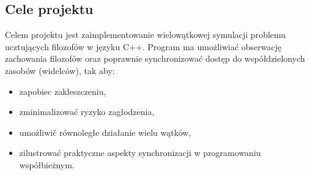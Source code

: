 \documentclass[a4paper,12pt]{article}
\begin{document}
        \subsection{Cele projektu}
            \vspace{1em}
            Celem projektu jest zaimplementowanie wielowątkowej symulacji problemu ucztujących filozofów w języku C++. Program ma umożliwiać obserwację zachowania filozofów oraz poprawnie synchronizować dostęp do współdzielonych zasobów (widelców), tak aby:
            \begin{itemize}
                \item zapobiec zakleszczeniu,
                \item zminimalizować ryzyko zagłodzenia,
                \item umożliwić równoległe działanie wielu wątków,
                \item zilustrować praktyczne aspekty synchronizacji w programowaniu współbieżnym.
            \end{itemize}
        \newpage
        \vspace*{2em}
\end{document}
